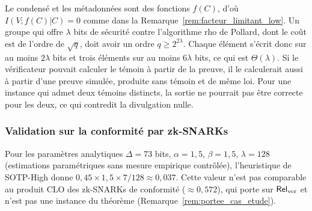 \begin{sloppypar}
\begin{Preuve}
Le condens\'e et les m\'etadonn\'ees sont des fonctions $f(C)$, d'o\`u $I(V;f(C)|C) = 0$
comme dans la Remarque~\ref{rem:facteur_limitant_low}. Un groupe qui offre $\lambda$
bits de s\'ecurit\'e contre l'algorithme rho de Pollard, dont le co\^ut est de l'ordre
de $\sqrt{q}$, doit avoir un ordre $q \geq 2^{2\lambda}$. Chaque \'el\'ement s'\'ecrit donc
sur au moins $2\lambda$ bits et trois \'el\'ements sur au moins $6\lambda$ bits, ce qui est
$\Theta(\lambda)$. Si le v\'erificateur pouvait calculer le t\'emoin \`a partir de la
preuve, il le calculerait aussi \`a partir d'une preuve simul\'ee, produite sans
t\'emoin et de m\^eme loi. Pour une instance qui admet deux t\'emoins distincts, la sortie
ne pourrait pas \^etre correcte pour les deux, ce qui contredit la divulgation nulle.
\end{Preuve}

\subsubsection{Validation sur la conformit\'e par zk-SNARKs}
\label{subsubsec:validation_snark}

Pour les param\`etres analytiques $\Delta = 73$ bits, $\alpha = 1{,}5$, $\beta = 1{,}5$,
$\lambda = 128$ (estimations param\'etriques sans mesure empirique contr\^ol\'ee),
l'heuristique de SOTP-High donne $0{,}45 \times 1{,}5 \times 7/128 \approx 0{,}037$.
Cette valeur n'est pas comparable au produit CLO des zk-SNARKs de conformit\'e
($\approx 0{,}572$), qui porte sur $\mathsf{Rel}_{\mathrm{ver}}$ et n'est pas une instance du
th\'eor\`eme (Remarque~\ref{rem:portee_cas_etude}).
\end{sloppypar}

